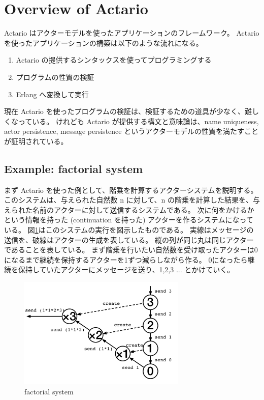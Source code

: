\section{Overview of Actario}
\label{sec:overview}

Actario はアクターモデルを使ったアプリケーションのフレームワーク。
Actario を使ったアプリケーションの構築は以下のような流れになる。

\begin{enumerate}
\item Actario の提供するシンタックスを使ってプログラミングする
\item プログラムの性質の検証
\item Erlang へ変換して実行
\end{enumerate}

現在 Actario を使ったプログラムの検証は、検証するための道具が少なく、難しくなっている。
けれども Actario が提供する構文と意味論は、name uniqueness, actor persistence, message persistence というアクターモデルの性質を満たすことが証明されている。

\subsection{Example: factorial system}
まず Actario を使った例として、階乗を計算するアクターシステムを説明する。
このシステムは、与えられた自然数 n に対して、n の階乗を計算した結果を、与えられた名前のアクターに対して送信するシステムである。
次に何をかけるかという情報を持った (continuation を持った) アクターを作るシステムになっている。
図\ref{fig:fact}はこのシステムの実行を図示したものである。
実線はメッセージの送信を、破線はアクターの生成を表している。
縦の列が同じ丸は同じアクターであることを表している。
まず階乗を行いたい自然数を受け取ったアクターは0になるまで継続を保持するアクターを1ずつ減らしながら作る。
0になったら継続を保持していたアクターにメッセージを送り、1,2,3 ... とかけていく。

\begin{figure}[t]
  \centering
  \includegraphics[width=8cm]{./images/fact.pdf}
  \caption{factorial system}\label{fig:fact}
\end{figure}

